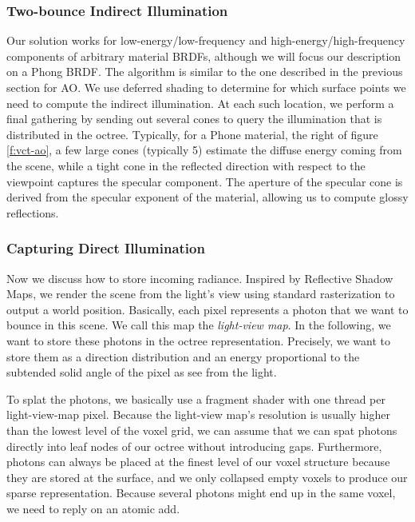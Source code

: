 \subsubsection{Two-bounce Indirect Illumination}
Our solution works for low-energy/low-frequency and high-energy/high-frequency components of arbitrary material BRDFs, although we will focus our description on a Phong BRDF. The algorithm is similar to the one described in the previous section for AO. We use deferred shading to determine for which surface points we need to compute the indirect illumination. At each such location, we perform a final gathering by sending out several cones to query the illumination that is distributed in the octree. Typically, for a Phone material, the right of figure \ref{f:vct-ao}, a few large cones (typically 5) estimate the diffuse energy coming from the scene, while a tight cone in the reflected direction with respect to the viewpoint captures the specular component. The aperture of the specular cone is derived from the specular exponent of the material, allowing us to compute glossy reflections.




\subsubsection{Capturing Direct Illumination}
Now we discuss how to store incoming radiance. Inspired by Reflective Shadow Maps\cite{a:ReflectiveShadowMaps}, we render the scene from the light's view using standard rasterization to output a world position.  Basically, each pixel represents a photon that we want to bounce in this scene. We call this map the \textit{light-view map}. In the following, we want to store these photons in the octree representation. Precisely, we want to store them as a direction distribution and an energy proportional to the subtended solid angle of the pixel as see from the light.

To splat the photons, we basically use a fragment shader with one thread per light-view-map pixel. Because the light-view map's resolution is usually higher than the lowest level of the voxel grid, we can assume that we can spat photons directly into leaf nodes of our octree without introducing gaps. Furthermore, photons can always be placed at the finest level of our voxel structure because they are stored at the surface, and we only collapsed empty voxels to produce our sparse representation. Because several photons might end up in the same voxel, we need to reply on an atomic add.

